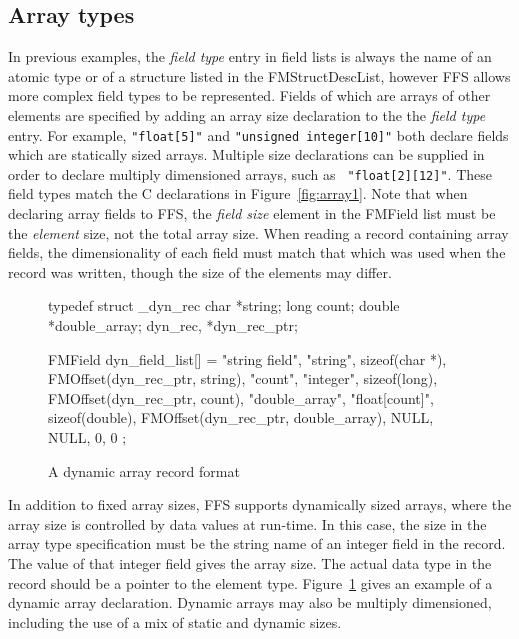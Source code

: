 \subsection{Array types}
In previous examples, the {\em field type} entry in field lists is always
the name of an atomic type or of a structure listed in the
FMStructDescList, however FFS allows more complex field types to be
represented.  Fields of which are arrays of other elements are specified by
adding an array size declaration to the the {\em field type} entry.  For
example, {\tt "float[5]"} and {\tt "unsigned integer[10]"} both declare
fields which are statically sized arrays.  Multiple size declarations can be
supplied in order to declare multiply dimensioned arrays, such as {\tt
  "float[2][12]"}.  These field types match the C declarations in
Figure~\ref{fig:array1}.   Note that when declaring array fields to FFS, the
{\em field size} element in the FMField list must be the {\em element} size,
not the total array size.  When reading a record containing array fields, the
dimensionality of each field must match that which was used when the record
was written, though the size of the elements may differ.

\begin{figure}
\begin{WrapCode}
typedef struct _dyn_rec {
    char        *string;
    long        count;
    double      *double_array;
} dyn_rec, *dyn_rec_ptr;

FMField dyn_field_list[] = {
    {"string field", "string", sizeof(char *), 
      FMOffset(dyn_rec_ptr, string)},
    {"count", "integer", sizeof(long), 
      FMOffset(dyn_rec_ptr, count)},
    {"double_array", "float[count]", sizeof(double), 
      FMOffset(dyn_rec_ptr, double_array)},
    { NULL, NULL, 0, 0}
};
\end{WrapCode}
\caption{A dynamic array record format\label{fig:dynarray}}
\end{figure}

In addition to fixed array sizes, FFS supports dynamically sized
arrays, where the array size is controlled by data values at run-time.  In
this case, the size in the array type specification must be the string name
of an integer field in the record.  The value of that integer field gives
the array size.  The actual data type in the record should be a pointer to
the element type.  Figure~\ref{fig:dynarray} gives an example of a dynamic
array declaration.  Dynamic arrays may also be multiply dimensioned,
including the use of a mix of static and dynamic sizes.

